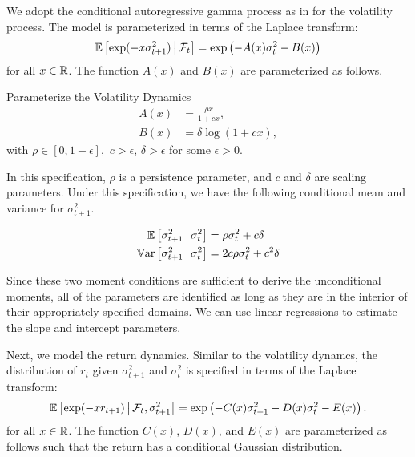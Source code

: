 \documentclass[11pt, letterpaper, twoside]{article}
\begin{document}
We adopt the conditional autoregressive gamma process as in \textcite{gourieroux2006autoregressive, han2018leverage} for the volatility process. The model is parameterized in terms of the Laplace transform: 
%
\begin{equation}
    \operatorname{\mathbb{E}}\left[\exp(-x \sigma^2_{t+1}) \,\middle\vert\, \mathcal{F}_{t}\right] = \exp\left(- A(x) \sigma^2_{t} - B(x)\right)
    \label{eqn:vol_laplace_transform}
\end{equation}
%
for all $x \in \mathbb{R}$. The function $A(x)$ and $B(x)$ are parameterized as follows.


\begin{defn}{Parameterize the Volatility Dynamics}
     \label{defn:physical_vol_dynamics}
     \begin{align}
        \label{defn:a_PP}
        A(x) &= \frac{\rho x}{1 + c x}, \\
        \label{defn:b_PP}
        B(x) &= \delta \log(1 + c x),
     \end{align}
with $\rho \in [0,1-\epsilon],$ $c > \epsilon$, $\delta > \epsilon$ for some $\epsilon > 0$.
\end{defn}

In this specification, $\rho$ is a persistence parameter, and $c$ and $\delta$ are scaling parameters. Under this specification, we have the following conditional mean and variance for $\sigma^2_{t+1}$.


\begin{remark} 
 \label{remark:vol_moment_conditions}
    \begin{align}
        \E\left[\sigma^2_{t+1} \mvert \sigma^2_t \right] &= \rho \sigma^2_t + c \delta\\
%   
        \Var\left[\sigma^2_{t+1} \mvert \sigma^2_t \right] &= 2 c \rho \sigma^2_t + c^2 \delta 
%   
    \end{align}
\end{remark}

Since these two moment conditions are sufficient to derive the unconditional moments, all of the parameters are identified as long as they are in the interior of their appropriately specified domains. We can use linear regressions to estimate the slope and intercept parameters.



Next, we model the return dynamics. Similar to the volatility dynamcs, the distribution of $r_t$ given $\sigma^2_{t+1}$ and $\sigma^2_{t}$ is specified in terms of the Laplace transform:
%
\begin{equation}
    \label{eqn:return_laplace_transform}
    \operatorname{\mathbb{E}}\left[\exp(- x r_{t+1}) \,\middle\vert\, \mathcal{F}_{t}, \sigma^2_{t+1} \right] = \exp\left(- C(x) \sigma^2_{t+1} - D(x) \sigma^2_t - E(x)\right).
\end{equation}
%
for all $x \in \mathbb{R}$. The function $C(x)$, $D(x)$, and $E(x)$ are parameterized as follows such that the return has a conditional Gaussian distribution.
\end{document}
